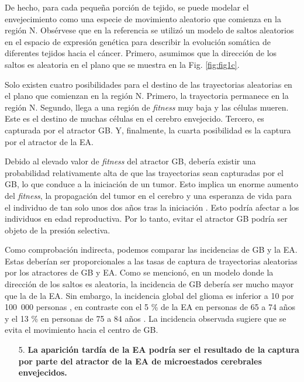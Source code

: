 De hecho, para cada pequeña porción de tejido, se puede modelar el envejecimiento como una especie de movimiento aleatorio que comienza en la región N. Obsérvese que en la referencia \cite{Herrero_2022} se utilizó un modelo de saltos aleatorios en el espacio de expresión genética para describir la evolución somática de diferentes tejidos hacia el cáncer. Primero, asumimos que la dirección de los saltos es aleatoria en el plano que se muestra en la Fig. \ref{fig:fig1c}.

Solo existen cuatro posibilidades para el destino de las trayectorias aleatorias en el plano que comienzan en la región N. Primero, la trayectoria permanece en la región N. Segundo, llega a una región de \textit{fitness} muy baja y las células mueren. Este es el destino de muchas células en el cerebro envejecido. Tercero, es capturada por el atractor GB. Y, finalmente, la cuarta posibilidad es la captura por el atractor de la EA.

Debido al elevado valor de \textit{fitness} del atractor GB, debería existir una probabilidad relativamente alta de que las trayectorias sean capturadas por el GB, lo que conduce a la iniciación de un tumor. Esto implica un enorme aumento del \textit{fitness}, la propagación del tumor en el cerebro y una esperanza de vida para el individuo de tan solo unos dos años tras la iniciación \cite{Poon_2020}. Esto podría afectar a los individuos en edad reproductiva. Por lo tanto, evitar el atractor GB podría ser objeto de la presión selectiva.

Como comprobación indirecta, podemos comparar las incidencias de GB y la EA. Estas deberían ser proporcionales a las tasas de captura de trayectorias aleatorias por los atractores de GB y EA. Como se mencionó, en un modelo donde la dirección de los saltos es aleatoria, la incidencia de GB debería ser mucho mayor que la de la EA. Sin embargo, la incidencia global del glioma es inferior a 10 por 100 000 personas \cite{Ohgaki2005}, en contraste con el 5 \% de la EA en personas de 65 a 74 años y el 13 \% en personas de 75 a 84 años \cite{alz2023}. La incidencia observada sugiere que se evita el movimiento hacia el centro de GB.

\begin{enumerate}
	\item[5.] \textbf{La aparición tardía de la EA podría ser el resultado de la captura por parte del atractor de la EA de microestados cerebrales envejecidos.}
\end{enumerate}


